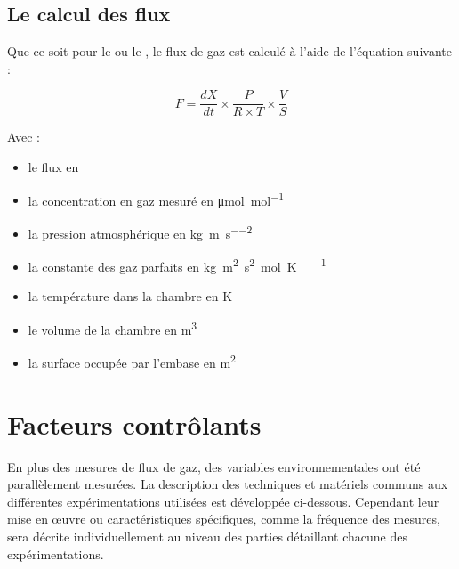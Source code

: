\subsection{Le calcul des flux}

Que ce soit pour le \coo ou le \chh, le flux de gaz est calculé à l'aide de l'équation suivante : 

\begin{equation}
F = \frac{dX}{dt} \times \frac{P}{R \times T} \times \frac{V}{S}
\end{equation}

Avec : 
\begin{itemize}
\item[F :] le flux en \si{\uml}
\item[X :] la concentration en gaz mesuré en \si{\micro\mole\per\mole}
\item[P :] la pression atmosphérique en \si{\kilo\gram\per\metre\per\square\second}
\item[R :] la constante des gaz parfaits en \si{\kilo\gram\square\metre\per\square\second\per\mole\per\kelvin}
\item[T :] la température dans la chambre en \si{\kelvin}
\item[V :] le volume de la chambre en \si{\cubic\metre}
\item[S :] la surface occupée par l'embase en \si{\square\metre}
\end{itemize}

%
%


\section{Facteurs contrôlants}
En plus des mesures de flux de gaz, des variables environnementales ont été parallèlement mesurées.
La description des techniques et matériels communs aux différentes expérimentations utilisées est développée ci-dessous.
Cependant leur mise en œuvre ou caractéristiques spécifiques, comme la fréquence des mesures, sera décrite individuellement au niveau des parties détaillant chacune des expérimentations.

